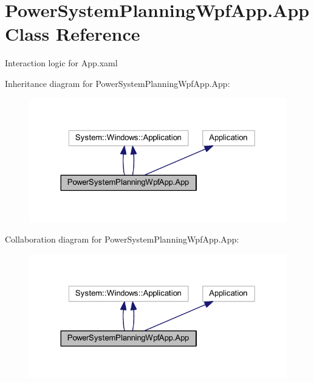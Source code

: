 \hypertarget{class_power_system_planning_wpf_app_1_1_app}{}\section{Power\+System\+Planning\+Wpf\+App.\+App Class Reference}
\label{class_power_system_planning_wpf_app_1_1_app}


Interaction logic for App.\+xaml  




Inheritance diagram for Power\+System\+Planning\+Wpf\+App.\+App\+:\nopagebreak
\begin{figure}[H]
\begin{center}
\leavevmode
\includegraphics[width=324pt]{class_power_system_planning_wpf_app_1_1_app__inherit__graph}
\end{center}
\end{figure}


Collaboration diagram for Power\+System\+Planning\+Wpf\+App.\+App\+:\nopagebreak
\begin{figure}[H]
\begin{center}
\leavevmode
\includegraphics[width=324pt]{class_power_system_planning_wpf_app_1_1_app__coll__graph}
\end{center}
\end{figure}

